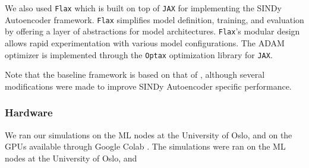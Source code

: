 We also used \verb|Flax| \cite{Flax2020github} which is built on top of \verb|JAX| for implementing the SINDy Autoencoder framework. \verb|Flax| simplifies model definition, training, and evaluation by offering a layer of abstractions for model architectures. \verb|Flax|’s modular design allows rapid experimentation with various model configurations. The \textsc{ADAM} optimizer is implemented through the \verb|Optax| \cite{deepmind2020jax} optimization library for \verb|JAX|. 

Note that the baseline framework is based on that of \textcite{lippe2024}, although several modifications were made to improve SINDy Autoencoder specific performance. 

\subsubsection{Hardware}
We ran our simulations on the ML nodes at the University of Oslo\cite{uio_ml_nodes}, and on the GPUs available through Google Colab \cite{googlecolab}. 
The simulations were ran on the ML nodes at the University of Oslo, and 
